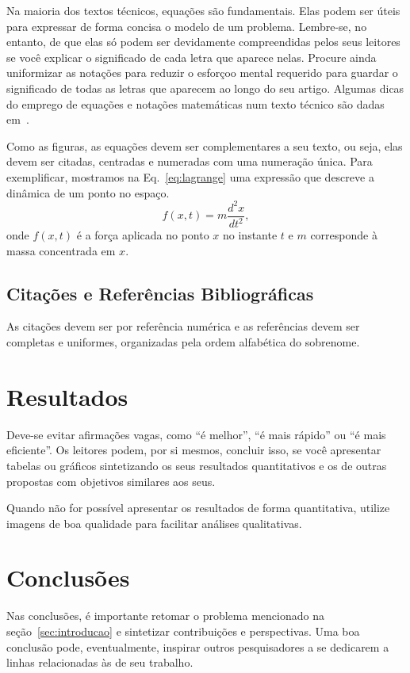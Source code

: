 \documentclass[11pt]{article}
\begin{document}
Na maioria dos textos técnicos, equações são fundamentais. Elas podem
ser úteis para expressar de forma concisa o modelo de um
problema. Lembre-se, no entanto, de que elas só podem ser devidamente
compreendidas pelos seus leitores se você explicar o significado de
cada letra que aparece nelas. Procure ainda uniformizar as notações
para reduzir o esforçoo mental requerido para guardar o significado de
todas as letras que aparecem ao longo do seu artigo. Algumas dicas do
emprego de equações e notações matemáticas num texto técnico são dadas
em~\cite{K99}.

Como as figuras, as equações devem ser complementares a seu texto, ou
seja, elas devem ser citadas, centradas e numeradas com uma numeração
única. Para exemplificar, mostramos na Eq.~\ref{eq:lagrange} uma
expressão que descreve a dinâmica de um ponto no espaço.
  \begin{equation}
  \label{eq:lagrange}
  f(x,t) = m \frac{d^2x}{dt^2},
  \end{equation}
onde $f(x,t)$ é a força aplicada no ponto $x$ no instante $t$ e $m$
corresponde à massa concentrada em $x$.

\subsection{Citações e Referências Bibliográficas}

As citações devem ser por referência numérica e as referências devem
ser completas e uniformes, organizadas pela ordem alfabética do
sobrenome.

\section{Resultados}

Deve-se evitar afirmações vagas, como ``é melhor'', ``é mais rápido''
ou ``é mais eficiente''. Os leitores podem, por si mesmos, concluir isso,
se você apresentar tabelas ou gráficos sintetizando os seus resultados
quantitativos e os de outras propostas com objetivos similares aos
seus.

Quando não for possível apresentar os resultados de forma
quantitativa, utilize imagens de boa qualidade para facilitar análises
qualitativas.

\section{Conclusões}

Nas conclusões, é importante retomar o problema mencionado na
seção~\ref{sec:introducao} e sintetizar contribuições e perspectivas.
Uma boa conclusão pode, eventualmente, inspirar outros pesquisadores a
se dedicarem a linhas relacionadas às de seu trabalho.
\end{document}
